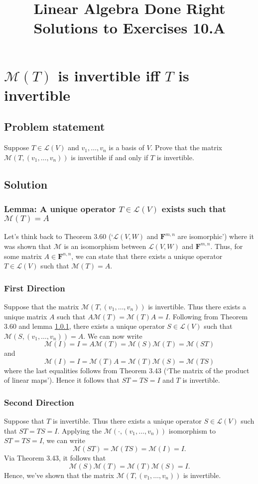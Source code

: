 \documentclass{article}
\title{Linear Algebra Done Right\\Solutions to Exercises 10.A}
\author{}
\date{}
\begin{document}
\maketitle

\section{$\mathcal{M}(T)$ is invertible iff $T$ is invertible}
\subsection*{Problem statement}
Suppose $T\in\mathcal{L}(V)$ and $v_1,\ldots,v_n$ is a basis of $V$. 
Prove that the matrix $\mathcal{M}(T,(v_1,\ldots,v_n))$ is invertible if and only if $T$ is invertible. 

\subsection*{Solution}
\subsubsection{Lemma: A unique operator $T\in\mathcal{L}(V)$ exists such that $\mathcal{M}(T)=A$}\label{sec:M_isomorphism}
Let's think back to Theorem 3.60 (`$\mathcal{L}(V,W)$ and $\mathbf{F}^{m,n}$ are isomorphic') where it was shown that $\mathcal{M}$ is an isomorphism between $\mathcal{L}(V,W)$ and $\mathbf{F}^{m,n}$. 
Thus, for some matrix $A\in\mathbf{F}^{n,n}$, we can state that there exists a unique operator $T\in\mathcal{L}(V)$ such that $\mathcal{M}(T)=A$.

\subsubsection*{First Direction}
Suppose that the matrix $\mathcal{M}(T,(v_1,\ldots,v_n))$ is invertible. 
Thus there exists a unique matrix $A$ such that $A\mathcal{M}(T)=\mathcal{M}(T)A=I$. 
Following from Theorem 3.60 and lemma \ref{sec:M_isomorphism}, there exists a unique operator $S\in\mathcal{L}(V)$ such that $\mathcal{M}(S,(v_1,\ldots,v_n))=A$. 
We can now write
\[\mathcal{M}(I)=I=A\mathcal{M}(T)=\mathcal{M}(S)\mathcal{M}(T)=\mathcal{M}(ST)\]
and 
\[\mathcal{M}(I)=I=\mathcal{M}(T)A=\mathcal{M}(T)\mathcal{M}(S)=\mathcal{M}(TS)\]
where the last equalities follows from Theorem 3.43 (`The matrix of the product of linear maps'). 
Hence it follows that $ST=TS=I$ and $T$ is invertible.

\subsubsection*{Second Direction}
Suppose that $T$ is invertible. 
Thus there exists a unique operator $S\in\mathcal{L}(V)$ such that $ST=TS=I$. 
Applying the $\mathcal{M}(\cdot,(v_1,\ldots,v_n))$ isomorphism to $ST=TS=I$, we can write
\[\mathcal{M}(ST)=\mathcal{M}(TS)=\mathcal{M}(I)=I.\]
Via Theorem 3.43, it follows that
\[\mathcal{M}(S)\mathcal{M}(T)=\mathcal{M}(T)\mathcal{M}(S)=I.\]
Hence, we've shown that the matrix $\mathcal{M}(T,(v_1,\ldots,v_n))$ is invertible.
\end{document}
